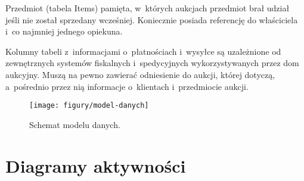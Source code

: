 \documentclass[10pt,a4paper]{article}
\newcommand{\s}[1]{\textsf{#1}}
\begin{document}
Przedmiot (tabela \s{Items}) pamięta, w~których aukcjach przedmiot brał udział
jeśli nie został sprzedany wcześniej. Koniecznie posiada referencję do
właściciela i~co najmniej jednego opiekuna.

Kolumny tabeli z~informacjami o~płatnościach i~wysyłce są uzależnione od
zewnętrznych systemów fiskalnych i~spedycyjnych wykorzystywanych przez dom
aukcyjny. Muszą na pewno zawierać odniesienie do aukcji, której dotyczą,
a~pośrednio przez nią informacje o~klientach i~przedmiocie aukcji.

\begin{figure}[p]
  \begin{adjustwidth}{-2cm}{-2cm}
    \centering
    \texttt{[image: figury/model-danych]}
    \caption{Schemat modelu danych.}
    \label{fig:model_danych}
  \end{adjustwidth}
\end{figure}

\newpage
\section{Diagramy aktywności}
\end{document}
